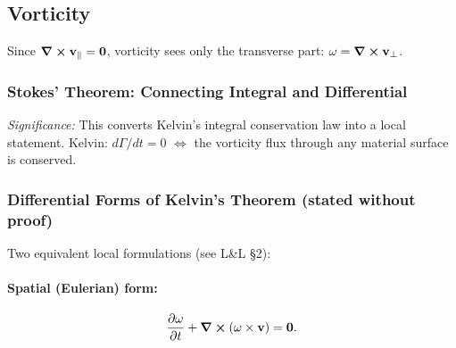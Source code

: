 \documentclass[../main.tex]{subfiles}
\begin{document}
\subsection{Vorticity}\label{sec:lec14:vorticity}

Since $\curl\mathbf{v}_\parallel=\mathbf{0}$, vorticity sees only the transverse part: $\mathbf{\omega}=\curl\mathbf{v}_\perp$.

\subsubsection{Stokes' Theorem: Connecting Integral and Differential}

\textit{Significance:} This converts Kelvin's integral conservation law into a local statement. Kelvin: $d\Gamma/dt=0$ $\Longleftrightarrow$ the vorticity flux through any material surface is conserved.

\subsubsection{Differential Forms of Kelvin's Theorem (stated without proof)}

Two equivalent local formulations (see L\&L §2):

\paragraph{Spatial (Eulerian) form:}
\begin{equation}
  \pdv{\mathbf{\omega}}{t} + \curl(\mathbf{\omega}\times\mathbf{v}) = \mathbf{0}.
  \label{eq:lec14_kelvin_spatial}
\end{equation}
\end{document}

